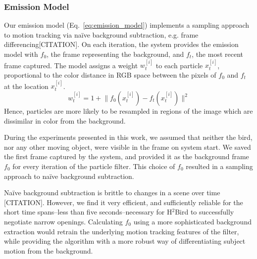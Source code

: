 \documentclass{aamas2013}
\providecommand{\norm}[1]{\lVert#1\rVert}
\begin{document}
\subsubsection{Emission Model}
Our emission model (Eq.~\ref{eq:emission_model}) implements a sampling
approach to motion tracking via na\"{i}ve background subtraction, e.g. frame 
differencing[CITATION]. On each iteration, the system provides the emission 
model with $f_0$, the frame representing the background, and $f_t$, the most 
recent frame captured. The model assigns a weight $w^{[i]}_t$ to each 
particle $x^{[i]}_t$, proportional to the color distance in RGB space 
between the pixels of $f_0$ and $f_t$ at the location $x^{[i]}_t$.
\begin{equation}
\label{eq:emission_model}
w^{[i]}_t = 1 + \norm{f_0(x^{[i]}_t)-f_t(x^{[i]}_t)}^2
\end{equation} 
Hence, particles are more likely to be resampled in regions of 
the image which are dissimilar in color from the background.

During the experiments presented in this work, we assumed that neither the 
bird, nor any other moving object, were visible in the frame on system 
start. We saved the first frame captured by the system, and provided it as 
the background frame $f_0$ for every iteration of the particle filter. This 
choice of $f_0$ resulted in a sampling approach to na\"{i}ve background 
subtraction. 

Na\"{i}ve background subtraction is brittle to changes in a scene over 
time [CITATION]. However, we find it very efficient, and sufficiently 
reliable for the short time spans--less than five seconds--necessary for 
H$^2$Bird to successfully negotiate narrow openings. Calculating $f_0$ 
using a more sophisticated background extraction would retrain the 
underlying motion tracking features of the filter, while providing the 
algorithm with a more robust way of differentiating subject motion from the 
background.

\end{document}
